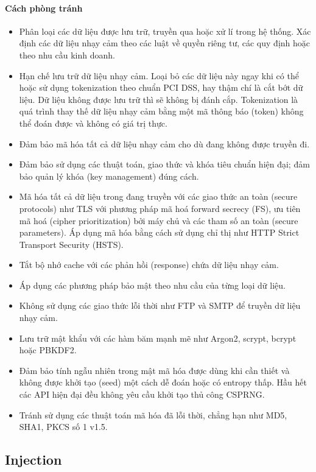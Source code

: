 \paragraph{Cách phòng tránh}

\begin{itemize}
    \item Phân loại các dữ liệu được lưu trữ, truyền qua hoặc xử lí trong hệ thống. Xác định các dữ liệu nhạy cảm theo các luật về quyền riêng tư, các quy định hoặc theo nhu cầu kinh doanh.
    \item Hạn chế lưu trữ dữ liệu nhạy cảm. Loại bỏ các dữ liệu này ngay khi có thể hoặc sử dụng tokenization theo chuẩn PCI DSS, hay thậm chí là cắt bớt dữ liệu. Dữ liệu không được lưu trữ thì sẽ không bị đánh cắp.
    Tokenization là quá trình thay thế dữ liệu nhạy cảm bằng một mã thông báo (token) không thể đoán được và không có giá trị thực.
    \item Đảm bảo mã hóa tất cả dữ liệu nhạy cảm cho dù đang không được truyền đi.
    \item Đảm bảo sử dụng các thuật toán, giao thức và khóa tiêu chuẩn hiện đại; đảm bảo quản lý khóa (key management) đúng cách.
    \item Mã hóa tất cả dữ liệu trong đang truyền với các giao thức an toàn (secure protocols) như TLS với phương pháp mã hoá forward secrecy (FS), ưu tiên mã hoá (cipher prioritization) bởi máy chủ và các tham số an toàn (secure parameters). Áp dụng mã hóa bằng cách sử dụng chỉ thị như HTTP Strict Transport Security (HSTS).
    \item Tắt bộ nhớ cache với các phản hồi (response) chứa dữ liệu nhạy cảm.
    \item Áp dụng các phương pháp bảo mật theo nhu cầu của từng loại dữ liệu.
    \item Không sử dụng các giao thức lỗi thời như FTP và SMTP để truyền dữ liệu nhạy cảm.
    \item Lưu trữ mật khẩu với các hàm băm mạnh mẽ như Argon2, scrypt, bcrypt hoặc PBKDF2.
    \item Đảm bảo tính ngẫu nhiên trong mật mã hóa được dùng khi cần thiết và không được khởi tạo (seed) một cách dễ đoán hoặc có entropy thấp. Hầu hết các API hiện đại đều không yêu cầu khởi tạo thủ công CSPRNG.
    \item Tránh sử dụng các thuật toán mã hóa đã lỗi thời, chẳng hạn như MD5, SHA1, PKCS số 1 v1.5.
\end{itemize}

\subsection{Injection ~\cite{chap2bib12}}

